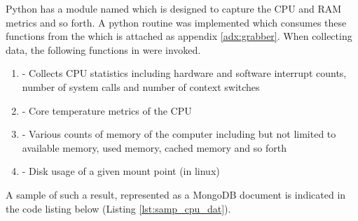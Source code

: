 Python has a module named  which is designed to capture the CPU and RAM metrics and so forth. A python routine was implemented which consumes these functions from the  which is attached as appendix \ref{adx:grabber}. When collecting data, the following functions in  were invoked.

\begin{enumerate}
    \item {} - Collects CPU statistics including hardware and software interrupt counts, number of system calls and number of context switches
    \item {} - Core temperature metrics of the CPU
    \item {} - Various counts of memory of the computer including but not limited to available memory, used memory, cached memory and so forth
    \item {} - Disk usage of a given mount point (in linux)
\end{enumerate}

A sample of such a result, represented as a MongoDB document is indicated in the code listing below (Listing \ref{lst:samp_cpu_dat}).

